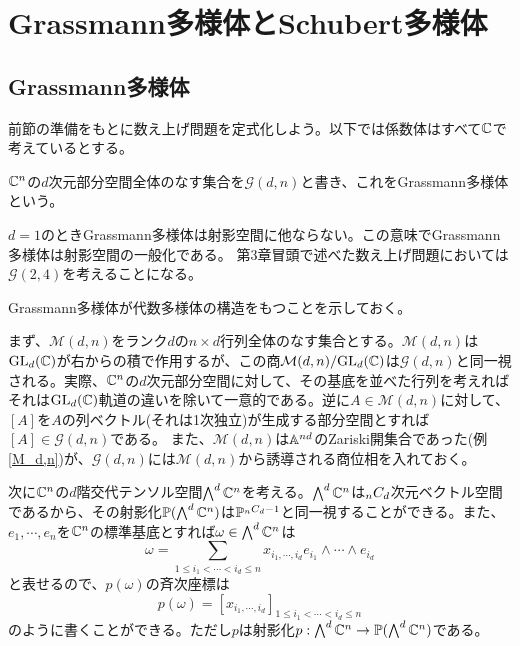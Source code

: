 \documentclass{ltjsreport}
\begin{document}
\section{Grassmann多様体とSchubert多様体}
\subsection{Grassmann多様体}

前節の準備をもとに数え上げ問題を定式化しよう。以下では係数体はすべて$\mathbb{C}$で考えているとする。

\begin{defin}
  $\mathbb{C}^{n}$の$d$次元部分空間全体のなす集合を$\mathcal{G}(d,n)$と書き、これをGrassmann多様体という。
\end{defin}

$d=1$のときGrassmann多様体は射影空間に他ならない。この意味でGrassmann多様体は射影空間の一般化である。
第3章冒頭で述べた数え上げ問題においては$\mathcal{G}(2,4)$を考えることになる。


Grassmann多様体が代数多様体の構造をもつことを示しておく。


まず、$\mathcal{M}(d,n)$をランク$d$の$n\times d$行列全体のなす集合とする。$\mathcal{M}(d,n)$は$\text{GL}_d(\mathbb{C})$が右からの積で作用するが、この商$\mathcal{M}(d,n)/\text{GL}_d(\mathbb{C})$は$\mathcal{G}(d,n)$と同一視される。実際、$\mathbb{C}^n$の$d$次元部分空間に対して、その基底を並べた行列を考えればそれは$\text{GL}_d(\mathbb{C})$軌道の違いを除いて一意的である。逆に$A\in\mathcal{M}(d,n)$に対して、$[A]$を$A$の列ベクトル(それは1次独立)が生成する部分空間とすれば$[A]\in\mathcal{G}(d,n)$である。
また、$\mathcal{M}(d,n)$は$\mathbb{A}^{nd}$のZariski開集合であった(例\ref{M_d,n})が、$\mathcal{G}(d,n)$には$\mathcal{M}(d,n)$から誘導される商位相を入れておく。


次に$\mathbb{C}^n$の$d$階交代テンソル空間$\bigwedge^d\mathbb{C}^n$を考える。$\bigwedge^d\mathbb{C}^n$は$_{n}C_{d}$次元ベクトル空間であるから、その射影化$\mathbb{P}(\bigwedge^d\mathbb{C}^n)$は$\mathbb{P}^{_{n}C_{d}-1}$と同一視することができる。また、$e_1,\cdots,e_n$を$\mathbb{C}^n$の標準基底とすれば$\omega\in\bigwedge^d\mathbb{C}^n$は
\[
\omega=\sum_{1\leq i_1<\cdots <i_d\leq n}x_{i_1,\cdots, i_d}e_{i_1}\wedge\cdots\wedge e_{i_d}  
\]
と表せるので、$p(\omega)$の斉次座標は
\[
p(\omega)=[x_{i_1,\cdots,i_d}]_{1\leq i_1<\cdots<i_d\leq n}  
\]
のように書くことができる。ただし$p$は射影化$p:\bigwedge^d\mathbb{C}^n\rightarrow \mathbb{P}(\bigwedge^d\mathbb{C}^n)$である。
\end{document}
